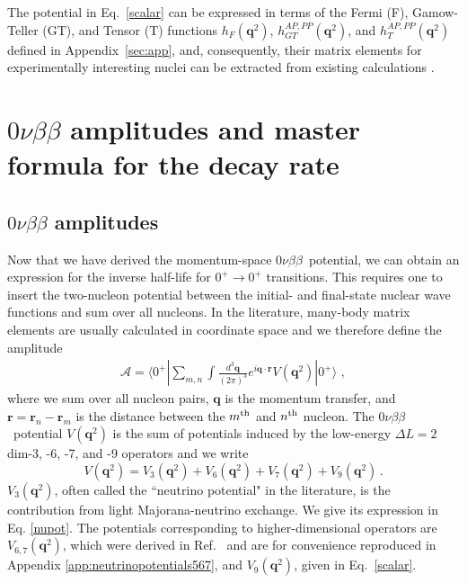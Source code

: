 \documentclass[letterpaper,11pt]{article}
\newcommand{\bea}{\begin{eqnarray}}
\newcommand{\eea}{\end{eqnarray}}
\renewcommand{\vec}[1]{{\mathbf #1}}
\newcommand{\sq}{^{2}}
\newcommand{\NLDBD}{$0 \nu \beta \beta$}
\begin{document}
The potential in Eq.~\eqref{scalar} can be expressed in terms of the Fermi (F), Gamow-Teller (GT), and Tensor (T) functions $h_F(\vec q\sq)$, $h^{AP,PP}_{GT}(\vec q\sq)$, and $h^{AP,PP}_{T}(\vec q\sq)$ defined in  Appendix~\ref{sec:app}, and, consequently, their matrix elements for experimentally interesting nuclei can be extracted from existing calculations \cite{Hyvarinen:2015bda,Menendez:2017fdf,Barea:2015kwa,Barea,Horoi:2017gmj}.




\section{$0\nu \beta \beta$ amplitudes and master formula for the decay rate}\label{Master}

\subsection{$0\nu \beta \beta$ amplitudes}
Now that we have derived the 
momentum-space  
\NLDBD\ potential, we can obtain an expression for the  inverse half-life for $0^+\rightarrow 0^+$ transitions. This requires one to insert the  two-nucleon potential between the initial- and final-state nuclear wave functions and sum over all nucleons. In the literature,  many-body matrix elements are usually calculated in coordinate space and we therefore define the 
amplitude
\bea \label{eq:FullAmp}
\mathcal A = \langle 0^+| \sum_{m,n} \int \frac{d^3\vec q}{(2\pi)^3} e^{i\vec q \cdot \vec r}V(\vec q\sq) |0^+\rangle\,\,,
\eea
where we sum over all nucleon pairs, $\vec q$ is the momentum transfer, and $\vec r = \vec r_n - \vec r_m$ is the distance between the $m^{\rm th}$ and $n^{\rm th}$ nucleon.  
The \NLDBD\ potential $V(\vec q\sq)$ is the sum of potentials induced by the low-energy $\Delta L=2$ dim-3, -6, -7, and -9 operators and we write
\begin{equation}
V(\vec q\sq) = V_{ 3}(\vec q\sq) + V_{ 6}(\vec q\sq) + V_{ 7}(\vec q\sq) + V_{9}(\vec q\sq)\,. 
\end{equation}
 $V_{3}(\vec q\sq)$, often called  the ``neutrino potential" in the literature, 
is the contribution from light Majorana-neutrino exchange. We give its expression in Eq. \eqref{nupot}. 
The potentials corresponding to higher-dimensional operators are 
$V_{6,7}(\vec q\sq)$, which were  derived in Ref.~\cite{Cirigliano:2017djv}
 and  are for convenience reproduced in Appendix \ref{app:neutrinopotentials567}, and $V_{ 9}(\vec q\sq)$,  given in Eq.~\eqref{scalar}.
\end{document}
